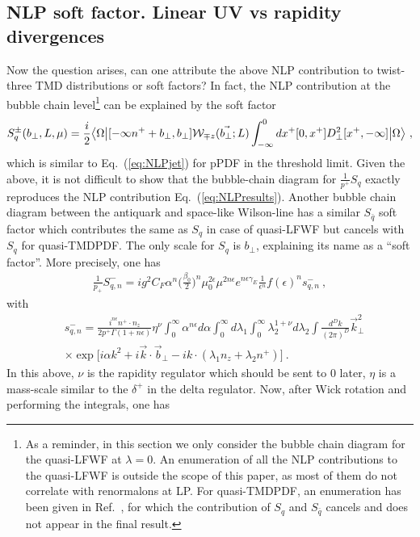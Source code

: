\documentclass[a4paper,11pt]{article}
\begin{document}
\subsection{NLP soft factor. Linear UV vs rapidity divergences}
Now the question arises, can one attribute the above NLP contribution to twist-three TMD distributions or soft factors?  In fact, the NLP contribution at the bubble chain level\footnote{As a reminder, in this section we only consider the bubble chain diagram for the quasi-LFWF at $\lambda=0$. An enumeration of all the NLP contributions to the quasi-LFWF is outside the scope of this paper, as most of them do not correlate with renormalons at LP. For quasi-TMDPDF, an enumeration has been given in Ref.~\cite{Rodini:2022wic}, for which the contribution of $S_q$ and $S_{\bar q}$ cancels and does not appear in the final result. } can be explained by the soft factor
\begin{align}\label{eq:NLPsoft}
S^{\pm}_{q}(b_\perp,L,\mu)=\frac{i}{2}\big\langle \Omega \big|[-\infty n^++b_\perp,b_\perp] {\cal W}_{\mp z}(\vec{b_\perp};L)\int_{-\infty}^{0} dx^+[0,x^+]D_\perp^2[x^+,-\infty]\big|\Omega \big\rangle \  ,
\end{align}
which is similar to Eq.~(\ref{eq:NLPjet}) for pPDF in the threshold limit. Given the above, it is not difficult to show that the bubble-chain diagram for $\frac{1}{p^+}S_q$ exactly reproduces the NLP contribution Eq.~(\ref{eq:NLPresults}). Another bubble chain diagram between the antiquark and space-like Wilson-line has a similar $S_{\bar q}$ soft factor which contributes the same as $S_{q}$ in case of quasi-LFWF but cancels with $S_q$ for quasi-TMDPDF. The only scale for $S_q$ is $b_\perp$, explaining its name as a ``soft factor''. More precisely, one has
\begin{align}
\frac{1}{p_+}S_{q,n}^-=ig^2C_F\alpha^n\bigg(\frac{\beta_0}{2}\bigg)^n\mu_0^{2\epsilon}\mu^{2n\epsilon}e^{n\epsilon \gamma_E}\frac{1}{\epsilon^n}f(\epsilon)^n s_{q,n}^- \ ,
\end{align}
with 
\begin{align}
&s_{q,n}^-=\frac{i^{n\epsilon}n^+\cdot n_z}{2p^+\Gamma(1+n\epsilon)}\eta^{\nu}\int_{0}^{\infty}\alpha^{n\epsilon}d\alpha\int_{0}^{\infty}d\lambda_1\int_{0}^{\infty}\lambda_2^{1+\nu }d\lambda_2\int \frac{d^Dk}{(2\pi)^D}\vec{k}_\perp^2 \nonumber \\ 
& \times \exp \bigg[i\alpha k^2+i\vec{k}\cdot \vec{b}_\perp-ik\cdot(\lambda_1 n_z+\lambda_2n^+)\bigg] \ .
\end{align}
In this above, $\nu$ is the rapidity regulator which should be sent to $0$ later, $\eta$ is a mass-scale similar to the $\delta^+$ in the delta regulator. Now, after Wick rotation and performing the integrals, one has
\end{document}
